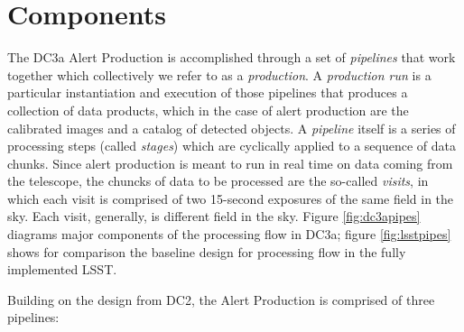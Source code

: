 
\section{Components}  \label{sec:components}

The DC3a Alert Production is accomplished through a set of
\textit{pipelines} that work together which collectively we refer to
as a \textit{production}.  A \textit{production run} is a particular
instantiation and execution of those pipelines that produces a
collection of data products, which in the case of alert production are
the calibrated images and a catalog of detected objects.  A
\textit{pipeline} itself is a series of processing steps (called
\textit{stages}) which are cyclically applied to a sequence of data
chunks.  Since alert production is meant to run in real time on data
coming from the telescope, the chuncks of data to be processed are the
so-called \textit{visits}, in which each visit is comprised of two
15-second exposures of the same field in the sky.  Each visit,
generally, is different field in the sky.    
Figure \ref{fig:dc3apipes} diagrams major components of the processing flow in DC3a;
figure \ref{fig:lsstpipes} shows for comparison the baseline design for processing 
flow in the fully implemented LSST.

Building on the design from DC2, the Alert Production is comprised of
three pipelines: 

